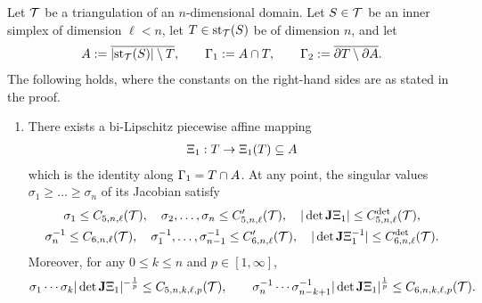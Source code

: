 \documentclass[10pt,a4paper]{article}
\begin{document}
        
        
        
        



\begin{proposition}\label{proposition:starreflection}
    Let ${\mathcal T}$ be a triangulation of an $n$-dimensional domain. 
    Let $S \in {\mathcal T}$ be an inner simplex of dimension $\ell < n$,
    let $T \in \operatorname{st}_{{\mathcal T}}(S)$ be of dimension $n$,
    and let 
    \begin{align*}
        A := \overline{ \left| \operatorname{st}_{{\mathcal T}}(S) \right| \setminus T },
        \qquad 
        {\Gamma_1} := A \cap T,
        \qquad 
        {\Gamma_2} := \overline{ \partial T \setminus \partial A }.
    \end{align*}
    The following holds, where the constants on the right-hand sides are as stated in the proof. 
    \begin{enumerate}
    \item 
    There exists a bi-Lipschitz piecewise affine mapping
    \begin{align*}
        \Xi_{1} : T \rightarrow \Xi_{1}(T) \subseteq A 
    \end{align*}
    which is the identity along ${\Gamma_1} = T \cap A$. 
    At any point, the singular values $\sigma_1 \geq \dots \geq \sigma_n$ of its Jacobian satisfy 
    \begin{gather*}
        \sigma_1 \leq C_{5,n,\ell}({\mathcal T}),
        \quad 
        \sigma_2,\dots,\sigma_n \leq C'_{5,n,\ell}({\mathcal T}),
        \quad 
        | \det{\mathbf{J}}\Xi_{1} |      \leq C^{\det}_{5,n,\ell}({\mathcal T}),
        \\
        \sigma_n^{-1} \leq C_{6,n,\ell}({\mathcal T}),
        \quad 
        \sigma_1^{-1},\dots,\sigma_{n-1}^{-1} \leq C'_{6,n,\ell}({\mathcal T}),
        \quad 
        | \det{\mathbf{J}}\Xi_{1}^{-1} | \leq C^{\det}_{6,n,\ell}({\mathcal T}).
    \end{gather*}
    Moreover, for any $0 \leq k \leq n$ and $p \in [1,\infty]$,
    \begin{align*}
        \sigma_{1}\cdots\sigma_{k} | \det{\mathbf{J}}\Xi_{1} |^{-\frac 1 p}
        \leq 
        C_{5,n,k,\ell,p}({\mathcal T}),
        \qquad 
        \sigma_{n}^{-1}\cdots\sigma_{n-k+1}^{-1} | \det{\mathbf{J}}\Xi_{1} |^{\frac 1 p}
        \leq 
        C_{6,n,k,\ell,p}({\mathcal T}).
    \end{align*}


\end{enumerate}
\end{proposition}
\end{document}
